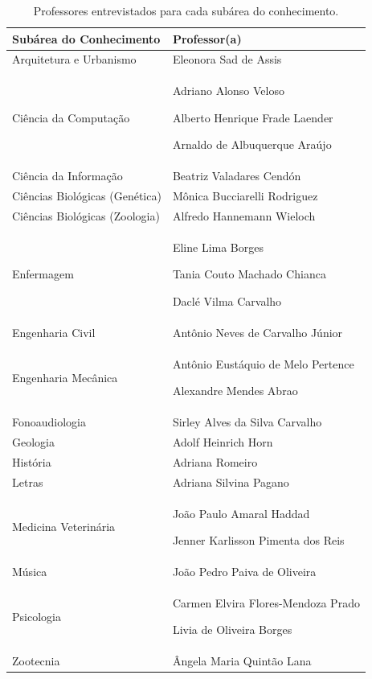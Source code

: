 \begin{table}
    \caption{Professores entrevistados para cada subárea do conhecimento.}
    \begin{center}
        \begin{tabular}{|p{6cm}|p{8cm}|}
            \hline 
            \textbf{Subárea do Conhecimento} & \textbf{Professor(a)}\\ 
            \hline 
            Arquitetura e Urbanismo & Eleonora Sad de Assis \\
            \hline
            Ciência da Computação & Adriano Alonso Veloso \par 
                                    Alberto Henrique Frade Laender \par 
                                    Arnaldo de Albuquerque Araújo \\
            \hline
            Ciência da Informação & Beatriz Valadares Cendón \\
            \hline
            Ciências Biológicas (Genética) & Mônica Bucciarelli Rodriguez \\
            \hline
            Ciências Biológicas (Zoologia) & Alfredo Hannemann Wieloch \\
            \hline
            Enfermagem & Eline Lima Borges \par
                         Tania Couto Machado Chianca \par
                         Daclé Vilma Carvalho \\
            \hline
            Engenharia Civil & Antônio Neves de Carvalho Júnior \\
            \hline
            Engenharia Mecânica & Antônio Eustáquio de Melo Pertence \par
                                  Alexandre Mendes Abrao \\
            \hline
            Fonoaudiologia & Sirley Alves da Silva Carvalho \\
            \hline
            Geologia & Adolf Heinrich Horn \\
            \hline
            História & Adriana Romeiro \\
            \hline
            Letras & Adriana Silvina Pagano \\
            \hline
            Medicina Veterinária & João Paulo Amaral Haddad \par
                                   Jenner Karlisson Pimenta dos Reis \\
            \hline
            Música & João Pedro Paiva de Oliveira \\

            \hline
            Psicologia & Carmen Elvira Flores-Mendoza Prado \par
                         Livia de Oliveira Borges \\
            \hline
            Zootecnia & Ângela Maria Quintão Lana \\
            \hline
        \end{tabular}
    \end{center}
    \label{tab:subareas-professores}
\end{table}


